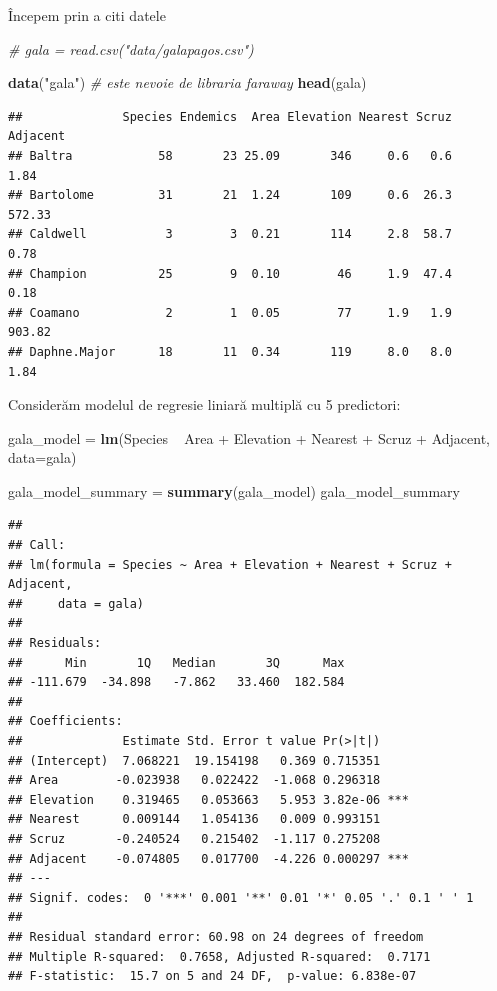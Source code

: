 \documentclass[]{article}
\newenvironment{Shaded}{\begin{snugshade}}{\end{snugshade}}
\newcommand{\KeywordTok}[1]{\textcolor[rgb]{0.13,0.29,0.53}{\textbf{{#1}}}}
\newcommand{\DataTypeTok}[1]{\textcolor[rgb]{0.13,0.29,0.53}{{#1}}}
\newcommand{\StringTok}[1]{\textcolor[rgb]{0.31,0.60,0.02}{{#1}}}
\newcommand{\CommentTok}[1]{\textcolor[rgb]{0.56,0.35,0.01}{\textit{{#1}}}}
\newcommand{\NormalTok}[1]{{#1}}
\begin{document}
Începem prin a citi datele

\begin{Shaded}
\begin{Highlighting}[]
\CommentTok{# gala = read.csv("data/galapagos.csv")}

\KeywordTok{data}\NormalTok{(}\StringTok{"gala"}\NormalTok{) }\CommentTok{# este nevoie de libraria faraway}
\KeywordTok{head}\NormalTok{(gala)}
\end{Highlighting}
\end{Shaded}

\begin{verbatim}
##              Species Endemics  Area Elevation Nearest Scruz Adjacent
## Baltra            58       23 25.09       346     0.6   0.6     1.84
## Bartolome         31       21  1.24       109     0.6  26.3   572.33
## Caldwell           3        3  0.21       114     2.8  58.7     0.78
## Champion          25        9  0.10        46     1.9  47.4     0.18
## Coamano            2        1  0.05        77     1.9   1.9   903.82
## Daphne.Major      18       11  0.34       119     8.0   8.0     1.84
\end{verbatim}

Considerăm modelul de regresie liniară multiplă cu 5 predictori:

\begin{Shaded}
\begin{Highlighting}[]
\NormalTok{gala_model =}\StringTok{ }\KeywordTok{lm}\NormalTok{(Species ~}\StringTok{ }\NormalTok{Area +}\StringTok{ }\NormalTok{Elevation +}\StringTok{ }\NormalTok{Nearest +}\StringTok{ }\NormalTok{Scruz +}\StringTok{ }\NormalTok{Adjacent, }\DataTypeTok{data=}\NormalTok{gala)}

\NormalTok{gala_model_summary =}\StringTok{ }\KeywordTok{summary}\NormalTok{(gala_model)}
\NormalTok{gala_model_summary}
\end{Highlighting}
\end{Shaded}

\begin{verbatim}
## 
## Call:
## lm(formula = Species ~ Area + Elevation + Nearest + Scruz + Adjacent, 
##     data = gala)
## 
## Residuals:
##      Min       1Q   Median       3Q      Max 
## -111.679  -34.898   -7.862   33.460  182.584 
## 
## Coefficients:
##              Estimate Std. Error t value Pr(>|t|)    
## (Intercept)  7.068221  19.154198   0.369 0.715351    
## Area        -0.023938   0.022422  -1.068 0.296318    
## Elevation    0.319465   0.053663   5.953 3.82e-06 ***
## Nearest      0.009144   1.054136   0.009 0.993151    
## Scruz       -0.240524   0.215402  -1.117 0.275208    
## Adjacent    -0.074805   0.017700  -4.226 0.000297 ***
## ---
## Signif. codes:  0 '***' 0.001 '**' 0.01 '*' 0.05 '.' 0.1 ' ' 1
## 
## Residual standard error: 60.98 on 24 degrees of freedom
## Multiple R-squared:  0.7658, Adjusted R-squared:  0.7171 
## F-statistic:  15.7 on 5 and 24 DF,  p-value: 6.838e-07
\end{verbatim}
\end{document}

